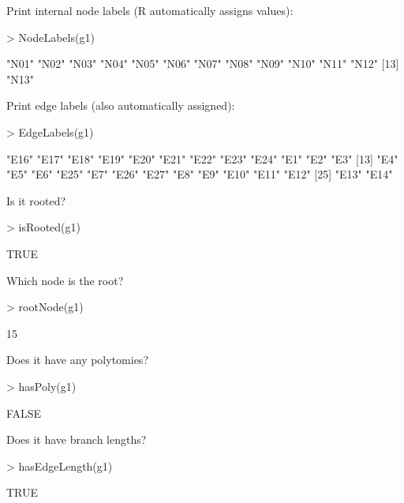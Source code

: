 \documentclass{article}
\begin{document}
Print internal node labels (R automatically assigns values):
\begin{Schunk}
\begin{Sinput}
> NodeLabels(g1)
\end{Sinput}
\begin{Soutput}
 [1] "N01" "N02" "N03" "N04" "N05" "N06" "N07" "N08" "N09" "N10" "N11" "N12"
[13] "N13"
\end{Soutput}
\end{Schunk}

Print edge labels (also automatically assigned):
\begin{Schunk}
\begin{Sinput}
> EdgeLabels(g1)
\end{Sinput}
\begin{Soutput}
 [1] "E16" "E17" "E18" "E19" "E20" "E21" "E22" "E23" "E24" "E1"  "E2"  "E3" 
[13] "E4"  "E5"  "E6"  "E25" "E7"  "E26" "E27" "E8"  "E9"  "E10" "E11" "E12"
[25] "E13" "E14"
\end{Soutput}
\end{Schunk}

Is it rooted?
\begin{Schunk}
\begin{Sinput}
> isRooted(g1)
\end{Sinput}
\begin{Soutput}
[1] TRUE
\end{Soutput}
\end{Schunk}

Which node is the root?
\begin{Schunk}
\begin{Sinput}
> rootNode(g1)
\end{Sinput}
\begin{Soutput}
[1] 15
\end{Soutput}
\end{Schunk}

Does it have any polytomies?
\begin{Schunk}
\begin{Sinput}
> hasPoly(g1)
\end{Sinput}
\begin{Soutput}
[1] FALSE
\end{Soutput}
\end{Schunk}

Does it have branch lengths?
\begin{Schunk}
\begin{Sinput}
> hasEdgeLength(g1)
\end{Sinput}
\begin{Soutput}
[1] TRUE
\end{Soutput}
\end{Schunk}
\end{document}
